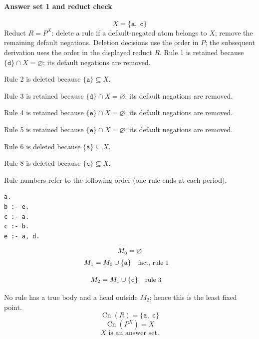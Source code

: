\documentclass[a4paper,11pt]{article}
\newif\ifexplain
\newcommand{\explain}[1]{\ifexplain\begin{erklbox}#1\end{erklbox}\fi}
\newcommand{\why}[1]{\text{\small #1}}
\newcommand{\at}[1]{\texttt{#1}}
\begin{document}
\paragraph{Answer set 1 and reduct check}
\[
X=\{\at{a},\;\at{c}\}
\]
Reduct $R=P^X$: delete a rule if a default-negated atom belongs to $X$; remove the remaining default negations. Deletion decisions use the order in $P$; the subsequent derivation uses the order in the displayed reduct $R$.
Rule 1 is retained because $\{\at{d}\}\cap X=\varnothing$; its default negations are removed.

Rule 2 is deleted because $\{\at{a}\}\subseteq X$.

Rule 3 is retained because $\{\at{d}\}\cap X=\varnothing$; its default negations are removed.

Rule 4 is retained because $\{\at{e}\}\cap X=\varnothing$; its default negations are removed.

Rule 5 is retained because $\{\at{e}\}\cap X=\varnothing$; its default negations are removed.

Rule 6 is deleted because $\{\at{a}\}\subseteq X$.

Rule 8 is deleted because $\{\at{c}\}\subseteq X$.

Rule numbers refer to the following order (one rule ends at each period).
\begin{small}
\begin{verbatim}
a.
b :- e.
c :- a.
c :- b.
e :- a, d.
\end{verbatim}
\end{small}
\explain{Beim Redukt bleibt die Kandidatenmenge fest. Wir entscheiden zuerst, welche Regeln wegfallen. Erst danach berechnen wir aus den verbleibenden positiven Regeln die kleinste abgeschlossene Menge. Ein Modell allein reicht nicht: Diese Menge muss genau der Kandidat sein.}
\[
M_0=\varnothing
\]
\begin{align*}
M_{1} &= M_{0}\cup \{\at{a}\} && \why{fact, rule 1}
\end{align*}
\explain{Diese Regel hat keinen Körper. Ihr Kopf $\at{a}$ ist damit ein Fakt und muss in die Menge.}
\begin{align*}
M_{2} &= M_{1}\cup \{\at{c}\} && \why{rule 3}
\end{align*}
\explain{Für $\at{c}$ brauchen wir $\at{a}$. Weil diese Voraussetzungen bereits hergeleitet sind, dürfen wir den Regelkopf jetzt aufnehmen und alle bisherigen Atome behalten; bei einer fehlenden Voraussetzung würde diese Regel dagegen noch nichts beitragen.}
No rule has a true body and a head outside $M_{2}$; hence this is the least fixed point.
\[
\operatorname{Cn}(R)=\{\at{a},\;\at{c}\}
\]
\[
\operatorname{Cn}(P^X)=X
\]
\[
\boxed{X\text{ is an answer set.}}
\]
\end{document}
